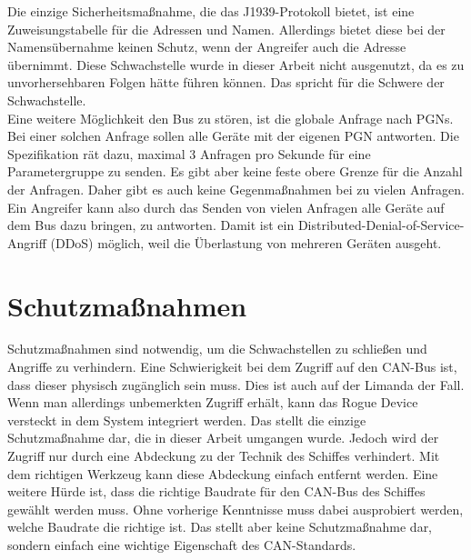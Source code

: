 Die einzige Sicherheitsmaßnahme, die das J1939-Protokoll bietet, ist eine Zuweisungstabelle für die Adressen und Namen. Allerdings
bietet diese bei der Namensübernahme keinen Schutz, wenn der Angreifer auch die Adresse übernimmt. Diese Schwachstelle 
wurde in dieser Arbeit nicht ausgenutzt, da es zu unvorhersehbaren Folgen hätte führen können. Das spricht für die 
Schwere der Schwachstelle.\\
Eine weitere Möglichkeit den Bus zu stören, ist die globale Anfrage nach PGNs. Bei einer solchen Anfrage sollen alle Geräte
mit der eigenen PGN antworten. Die Spezifikation rät dazu, maximal 3 Anfragen pro Sekunde für eine Parametergruppe zu senden.
Es gibt aber keine feste obere Grenze für die Anzahl der Anfragen. Daher gibt es auch keine Gegenmaßnahmen bei zu vielen 
Anfragen. Ein Angreifer kann also durch das Senden von vielen Anfragen alle Geräte auf dem Bus dazu bringen, zu antworten.
Damit ist ein Distributed-Denial-of-Service-Angriff (DDoS) möglich, weil die Überlastung von mehreren Geräten ausgeht. \\
\cite{Murvay2018}


\section{Schutzmaßnahmen}
Schutzmaßnahmen sind notwendig, um die Schwachstellen zu schließen und Angriffe zu verhindern.
Eine Schwierigkeit bei dem Zugriff auf den CAN-Bus ist, dass dieser physisch zugänglich sein muss. Dies ist auch auf der Limanda
der Fall. Wenn man allerdings unbemerkten Zugriff erhält, kann das Rogue Device versteckt in dem System integriert werden. 
Das stellt die einzige Schutzmaßnahme dar, die in dieser Arbeit umgangen wurde. Jedoch wird der Zugriff nur durch eine Abdeckung zu der Technik des Schiffes
verhindert. Mit dem richtigen Werkzeug kann diese Abdeckung einfach entfernt werden.
Eine weitere Hürde ist, dass die richtige Baudrate für den CAN-Bus des Schiffes gewählt werden muss. Ohne vorherige Kenntnisse
muss dabei ausprobiert werden, welche Baudrate die richtige ist. Das stellt aber keine Schutzmaßnahme dar, sondern einfach
eine wichtige Eigenschaft des CAN-Standards.\\

